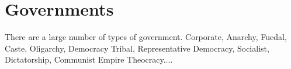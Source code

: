 \chapter{Governments }

There are a large number of types of government. 
Corporate, Anarchy, Fuedal, Caste, Oligarchy, Democracy
Tribal, Representative Democracy, Socialist, Dictatorship, Communist
Empire Theocracy....


